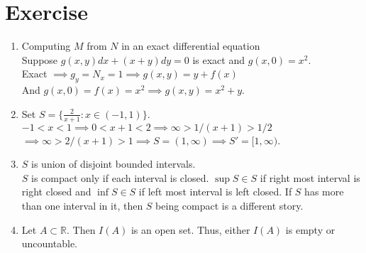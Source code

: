 \section*{Exercise}
\begin{enumerate}
	\item Computing $M$ from $N$ in an exact differential equation\\
		Suppose $g(x,y)dx + (x+y)dy = 0$ is exact and $g(x,0) = x^2$.\\
		Exact $\implies g_y = N_x = 1 \implies g(x,y) = y+f(x)$\\ And $g(x,0) = f(x) = x^2 \implies g(x,y) = x^2+y$.
	\item Set $S = \{ \frac{2}{x+1} : x \in (-1,1) \}$.\\
		$-1 < x < 1 \implies 0 < x+1 < 2 \implies \infty > 1/(x+1) > 1/2$\\
		$\implies \infty > 2/(x+1) > 1 \implies S = (1,\infty) \implies S' = [1,\infty)$.
	\item $S$ is union of disjoint bounded intervals.\\
		$S$ is compact only if each interval is closed. $\sup S \in S$ if right most interval is right closed and $\inf S \in S$ if left most interval is left closed. If $S$ has more than one interval in it, then $S$ being compact is a different story.
	\item Let $A \subset \mathbb{R}$. Then $I(A)$ is an open set. Thus, either $I(A)$ is empty or uncountable.
\end{enumerate}

